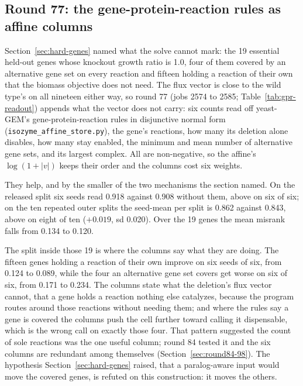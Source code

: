\subsection{Round 77: the gene-protein-reaction rules as affine columns}
\label{sec:round77}

Section~\ref{sec:hard-genes} named what the solve cannot mark: the 19 essential held-out
genes whose knockout growth ratio is 1.0, four of them covered by an alternative gene set
on every reaction and fifteen holding a reaction of their own that the biomass objective
does not need. The flux vector is close to the wild type's on all nineteen either way, so
round 77 (jobs 2574 to 2585; Table~\ref{tab:gpr-readout}) appends what the vector does not
carry: six counts read off yeast-GEM's gene-protein-reaction rules in disjunctive normal
form (\texttt{isozyme\_affine\_store.py}), the gene's reactions, how many its deletion
alone disables, how many stay enabled, the minimum and mean number of alternative gene
sets, and its largest complex. All are non-negative, so the affine's $\log(1 + |v|)$
keeps their order and the columns cost six weights.

They help, and by the smaller of the two mechanisms the section named. On the released
split six seeds read 0.918 against 0.908 without them, above on six of six; on the ten
repeated outer splits the seed-mean per split is 0.862 against 0.843, above on eight of
ten ($+0.019$, sd 0.020). Over the 19 genes the mean misrank falls from 0.134 to 0.120.

The split inside those 19 is where the columns say what they are doing. The fifteen genes
holding a reaction of their own improve on six seeds of six, from 0.124 to 0.089, while
the four an alternative gene set covers get worse on six of six, from 0.171 to 0.234. The
columns state what the deletion's flux vector cannot, that a gene holds a reaction nothing
else catalyzes, because the program routes around those reactions without needing them;
and where the rules say a gene is covered the columns push the cell further toward calling
it dispensable, which is the wrong call on exactly those four. That pattern suggested the
count of sole reactions was the one useful column; round 84 tested it and the six columns
are redundant among themselves (Section~\ref{sec:round84-98}). The
hypothesis Section~\ref{sec:hard-genes} raised, that a paralog-aware input would move the
covered genes, is refuted on this construction: it moves the others.



